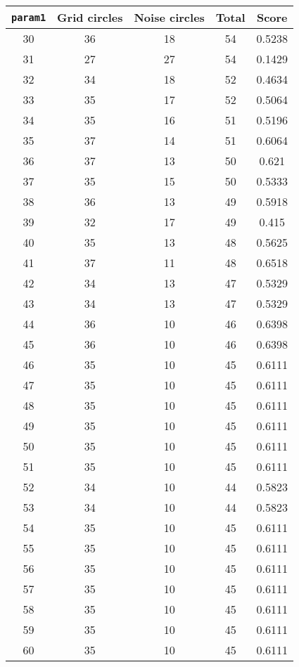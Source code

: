 \documentclass[letterpaper, 12pt]{article}
\begin{document}
\begin{longtable}{|c|c|c|c|c|}
\hline
\textbf{\texttt{param1}} & \textbf{Grid circles} & \textbf{Noise circles} & \textbf{Total} & \textbf{Score} \\
\hline
30 & 36 & 18 & 54 & 0.5238 \\
\hline
31 & 27 & 27 & 54 & 0.1429 \\
\hline
32 & 34 & 18 & 52 & 0.4634 \\
\hline
33 & 35 & 17 & 52 & 0.5064 \\
\hline
34 & 35 & 16 & 51 & 0.5196 \\
\hline
35 & 37 & 14 & 51 & 0.6064 \\
\hline
36 & 37 & 13 & 50 & 0.621 \\
\hline
37 & 35 & 15 & 50 & 0.5333 \\
\hline
38 & 36 & 13 & 49 & 0.5918 \\
\hline
39 & 32 & 17 & 49 & 0.415 \\
\hline
40 & 35 & 13 & 48 & 0.5625 \\
\hline
41 & 37 & 11 & 48 & 0.6518 \\
\hline
42 & 34 & 13 & 47 & 0.5329 \\
\hline
43 & 34 & 13 & 47 & 0.5329 \\
\hline
44 & 36 & 10 & 46 & 0.6398 \\
\hline
45 & 36 & 10 & 46 & 0.6398 \\
\hline
46 & 35 & 10 & 45 & 0.6111 \\
\hline
47 & 35 & 10 & 45 & 0.6111 \\
\hline
48 & 35 & 10 & 45 & 0.6111 \\
\hline
49 & 35 & 10 & 45 & 0.6111 \\
\hline
50 & 35 & 10 & 45 & 0.6111 \\
\hline
51 & 35 & 10 & 45 & 0.6111 \\
\hline
52 & 34 & 10 & 44 & 0.5823 \\
\hline
53 & 34 & 10 & 44 & 0.5823 \\
\hline
54 & 35 & 10 & 45 & 0.6111 \\
\hline
55 & 35 & 10 & 45 & 0.6111 \\
\hline
56 & 35 & 10 & 45 & 0.6111 \\
\hline
57 & 35 & 10 & 45 & 0.6111 \\
\hline
58 & 35 & 10 & 45 & 0.6111 \\
\hline
59 & 35 & 10 & 45 & 0.6111 \\
\hline
60 & 35 & 10 & 45 & 0.6111 \\

\end{longtable}
\end{document}
